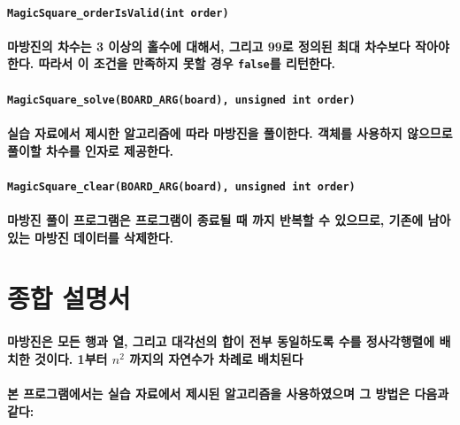 \documentclass[UTF8]{report}
\begin{document}
            \paragraph{\texttt{MagicSquare\_orderIsValid(int order)}}
            \paragraph{%
                \normalfont 마방진의 차수는 3 이상의 홀수에 대해서, 그리고 99로 정의된 최대 차수보다 작아야 한다. 따라서 이 조건을 만족하지 못할 경우 \texttt{false}를 리턴한다.
            }

            \paragraph{\texttt{MagicSquare\_solve(BOARD\_ARG(board), unsigned int order)}}
            \paragraph{%
                \normalfont 실습 자료에서 제시한 알고리즘에 따라 마방진을 풀이한다. 객체를 사용하지 않으므로 풀이할 차수를 인자로 제공한다.
            }

            \paragraph{\texttt{MagicSquare\_clear(BOARD\_ARG(board), unsigned int order)}}
            \paragraph{%
                \normalfont 마방진 풀이 프로그램은 프로그램이 종료될 때 까지 반복할 수 있으므로, 기존에 남아있는 마방진 데이터를 삭제한다.
            }

        \section{종합 설명서}

            \paragraph{%
                \normalfont 마방진은 모든 행과 열, 그리고 대각선의 합이 전부 동일하도록 수를 정사각행렬에 배치한 것이다. 1부터 $n^2$ 까지의 자연수가 차례로 배치된다
            }

            \paragraph{%
                \normalfont 본 프로그램에서는 실습 자료에서 제시된 알고리즘을 사용하였으며 그 방법은 다음과 같다:
            }
\end{document}
